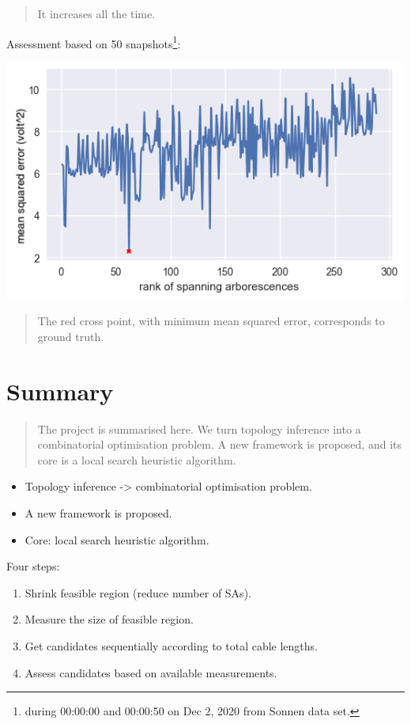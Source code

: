 \documentclass[
]{book}
\providecommand{\tightlist}{%
  \setlength{\itemsep}{0pt}\setlength{\parskip}{0pt}}
\begin{document}
\begin{quote}
It increases all the time.
\end{quote}

Assessment based on 50 snapshots\footnote{during 00:00:00 and 00:00:50 on Dec 2, 2020
  from Sonnen data set.}:

\begin{center}\includegraphics{Pictures/errors_288} \end{center}

\begin{quote}
The red cross point, with minimum mean squared error, corresponds to ground
truth.
\end{quote}

\hypertarget{summary}{%
\section{Summary}\label{summary}}

\begin{quote}
The project is summarised here. We turn topology inference into a
combinatorial optimisation problem. A new framework is proposed, and its core
is a local search heuristic algorithm.
\end{quote}

\begin{itemize}
\tightlist
\item
  Topology inference -\textgreater{} combinatorial optimisation problem.
\item
  A new framework is proposed.
\item
  Core: local search heuristic algorithm.
\end{itemize}

Four steps:

\begin{enumerate}
\def\labelenumi{\arabic{enumi}.}
\tightlist
\item
  Shrink feasible region (reduce number of SAs).
\item
  Measure the size of feasible region.
\item
  Get candidates sequentially according to total cable lengths.
\item
  Assess candidates based on available measurements.
\end{enumerate}
\end{document}
